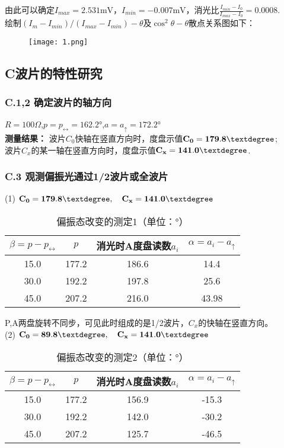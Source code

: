 \documentclass{ctexart}
\begin{document}
\noindent 由此可以确定$I_{max}=2.531\mathrm{mV}$，$I_{min}=-0.007\mathrm{mV}$，消光比$\frac{I_{min}-I_0}{I_{max}-I_0}=0.0008.$\\
绘制$(I_{m}-I_{min})/(I_{max}-I_{min})-\theta$及$\cos^2{\theta}-\theta$散点关系图如下：
\begin{figure}[htbp]
  \centering
  \texttt{[image: 1.png]}
\end{figure}

\clearpage
\subsection*{C\quad 波片的特性研究}
\subsubsection*{C.1,2 \quad 确定波片的轴方向}
\noindent $R=100\Omega$,\quad $p=p_{\leftrightarrow}=162.2°$,\quad $a=a_{\uparrow}=172.2°$\\
\noindent \textbf{测量结果：} 波片$C_0$快轴在竖直方向时，度盘示值$\bf{C_0}=179.8°$;\\
\indent \quad \quad \quad 波片$C_x$的某一轴在竖直方向时，度盘示值$\bf{C_x}=141.0°$.

\subsubsection*{C.3 \quad 观测偏振光通过1/2波片或全波片}
\noindent (1) $\bf{C_0}=179.8°, \quad \bf{C_x}=141.0°$
\begin{table}[!htbp]
  \centering
  \caption{偏振态改变的测定1（单位：°）}\vspace{0.3em} \label{tab:aStrangeTable}%
  \begin{tabular}{c|ccc}
  \toprule
  $\beta=p-p_{\leftrightarrow}$& $p$& 消光时A度盘读数$a_i$&$\alpha=a_i-a_{\uparrow}$ \\
  \midrule
  15.0& 177.2& 186.6& 14.4\\
  30.0& 192.2& 197.8& 25.6\\
  45.0& 207.2& 216.0& 43.98\\
  \bottomrule
  \end{tabular}
  \end{table}

\noindent P,A两盘旋转不同步，可见此时组成的是1/2波片，$C_x$的快轴在竖直方向。\\
\noindent (2) $\bf{C_0}=89.8°, \quad \bf{C_x}=141.0°$
\begin{table}[!htbp]
  \centering
  \caption{偏振态改变的测定2（单位：°）}\vspace{0.3em} \label{tab:aStrangeTable}%
  \begin{tabular}{c|ccc}
  \toprule
  $\beta=p-p_{\leftrightarrow}$& $p$& 消光时A度盘读数$a_i$&$\alpha=a_i-a_{\uparrow}$ \\
  \midrule
  15.0& 177.2& 156.9& -15.3\\
  30.0& 192.2& 142.0& -30.2\\
  45.0& 207.2& 125.7& -46.5\\
  \bottomrule
  \end{tabular}
  \end{table}
\end{document}
